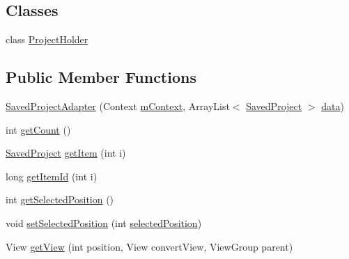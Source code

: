 \subsection*{Classes}
\begin{DoxyCompactItemize}
\item 
class \hyperlink{classorg_1_1buildmlearn_1_1toolkit_1_1adapter_1_1SavedProjectAdapter_1_1ProjectHolder}{Project\+Holder}
\end{DoxyCompactItemize}
\subsection*{Public Member Functions}
\begin{DoxyCompactItemize}
\item 
\hyperlink{classorg_1_1buildmlearn_1_1toolkit_1_1adapter_1_1SavedProjectAdapter_a8a42e7c094f6ce608a5bfb1e5e79a11f}{Saved\+Project\+Adapter} (Context \hyperlink{classorg_1_1buildmlearn_1_1toolkit_1_1adapter_1_1SavedProjectAdapter_a1fd3cc434700fb304d3d0b6b821eaf55}{m\+Context}, Array\+List$<$ \hyperlink{classorg_1_1buildmlearn_1_1toolkit_1_1model_1_1SavedProject}{Saved\+Project} $>$ \hyperlink{classorg_1_1buildmlearn_1_1toolkit_1_1adapter_1_1SavedProjectAdapter_aff22bb73e6dc24e2416b65607365230f}{data})
\item 
int \hyperlink{classorg_1_1buildmlearn_1_1toolkit_1_1adapter_1_1SavedProjectAdapter_a143869cd5a7b07ef9891db54b7aadd94}{get\+Count} ()
\item 
\hyperlink{classorg_1_1buildmlearn_1_1toolkit_1_1model_1_1SavedProject}{Saved\+Project} \hyperlink{classorg_1_1buildmlearn_1_1toolkit_1_1adapter_1_1SavedProjectAdapter_ae1b4a43ad80a736a832e74164a538e71}{get\+Item} (int i)
\item 
long \hyperlink{classorg_1_1buildmlearn_1_1toolkit_1_1adapter_1_1SavedProjectAdapter_ae1ad9d54393c2f9187c9e5bce00bcea3}{get\+Item\+Id} (int i)
\item 
int \hyperlink{classorg_1_1buildmlearn_1_1toolkit_1_1adapter_1_1SavedProjectAdapter_a6f29ddd1f6a07956e40dc08d6dac1ca5}{get\+Selected\+Position} ()
\item 
void \hyperlink{classorg_1_1buildmlearn_1_1toolkit_1_1adapter_1_1SavedProjectAdapter_a655d12fdaa5a55ef08cecaab72cfeda5}{set\+Selected\+Position} (int \hyperlink{classorg_1_1buildmlearn_1_1toolkit_1_1adapter_1_1SavedProjectAdapter_aabfa505b7e2443686bf6c8e1ab1f65b8}{selected\+Position})
\item 
View \hyperlink{classorg_1_1buildmlearn_1_1toolkit_1_1adapter_1_1SavedProjectAdapter_a80768fbb566b6f75f2e8c699122dcbc2}{get\+View} (int position, View convert\+View, View\+Group parent)
\end{DoxyCompactItemize}
